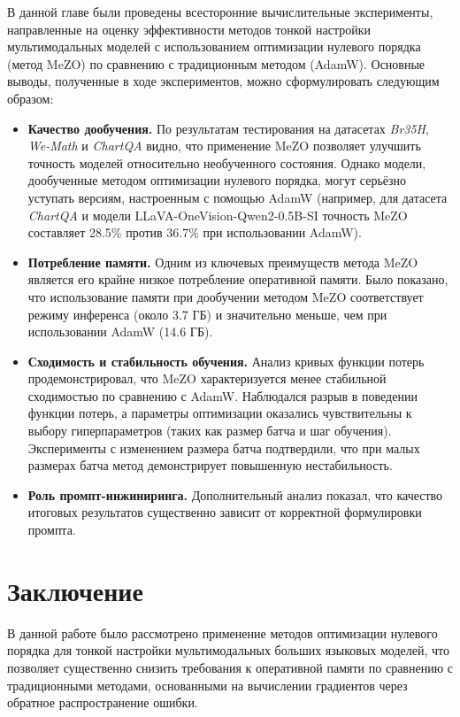 \documentclass[LI,KR]{HSEUniversity}
\begin{document}
В данной главе были проведены всесторонние вычислительные эксперименты, направленные на оценку эффективности методов тонкой настройки мультимодальных моделей с использованием оптимизации нулевого порядка (метод MeZO) по сравнению с традиционным методом (AdamW).
Основные выводы, полученные в ходе экспериментов, можно сформулировать следующим образом:

\begin{itemize}
    \item \textbf{Качество дообучения.} По результатам тестирования на датасетах \textit{Br35H}, \textit{We-Math} и \textit{ChartQA} видно, что применение MeZO позволяет улучшить точность моделей относительно необученного состояния.
Однако модели, дообученные методом оптимизации нулевого порядка, могут серьёзно уступать версиям, настроенным с помощью AdamW (например, для датасета \textit{ChartQA} и модели LLaVA-OneVision-Qwen2-0.5B-SI точность MeZO составляет 28.5\% против 36.7\% при использовании AdamW).

    \item \textbf{Потребление памяти.} Одним из ключевых преимуществ метода MeZO является его крайне низкое потребление оперативной памяти.
Было показано, что использование памяти при дообучении методом MeZO соответствует режиму инференса (около 3.7 ГБ) и значительно меньше, чем при использовании AdamW (14.6 ГБ).

    \item \textbf{Сходимость и стабильность обучения.} Анализ кривых функции потерь продемонстрировал, что MeZO характеризуется менее стабильной сходимостью по сравнению с AdamW.
Наблюдался разрыв в поведении функции потерь, а параметры оптимизации оказались чувствительны к выбору гиперпараметров (таких как размер батча и шаг обучения).
Эксперименты с изменением размера батча подтвердили, что при малых размерах батча метод демонстрирует повышенную нестабильность.

    \item \textbf{Роль промпт-инжиниринга.} Дополнительный анализ показал, что качество итоговых результатов существенно зависит от корректной формулировки промпта.
\end{itemize}

\chapter*{Заключение}

В данной работе было рассмотрено применение методов оптимизации нулевого порядка для тонкой настройки мультимодальных больших языковых моделей,
что позволяет существенно снизить требования к оперативной памяти по сравнению с традиционными методами,
основанными на вычислении градиентов через обратное распространение ошибки.
\end{document}
